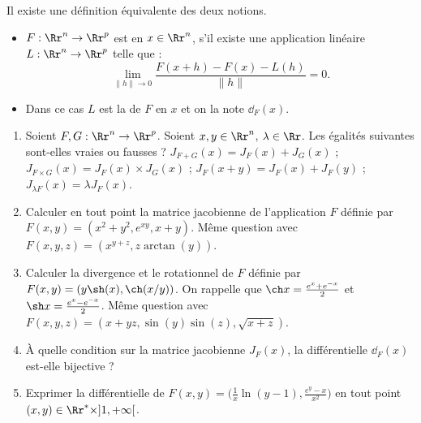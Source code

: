 \documentclass[12pt, class=report,crop=false]{standalone}
\begin{document}
\begin{remarque*}  
Il existe une définition équivalente des deux notions.

\begin{itemize}

  \item $F : \Rr^n \to \Rr^p$ est  en $x \in \Rr^n$, s'il existe une {application linéaire} $L : \Rr^n \to \Rr^p$ telle que :
$$
\lim_{\|h\| \to 0}  \frac{F(x + h) - F(x) - L (h)}{\|h\|} = 0 .$$

 \item Dans ce cas $L$ est la  de $F$ en $x$ et on la note $\dd_F(x)$.
\end{itemize}
\end{remarque*}


 
\begin{miniexercices}
\sauteligne
\begin{enumerate}
  \item Soient $F,G : \Rr^n \to \Rr^p$. Soient $x,y \in \Rr^n$, $\lambda \in \Rr$. Les égalités suivantes sont-elles vraies ou fausses ? 
  $J_{F+G} (x) = J_F(x) + J_G (x)$ ;
  $J_{F \times G} (x) = J_F(x) \times J_G (x)$ ;
  $J_{F} (x+y) = J_F(x) + J_F (y)$ ;  
  $J_{\lambda F} (x)= \lambda J_F (x)$.
  

  \item Calculer en tout point la matrice jacobienne de l'application $F$ définie par $F(x,y) = (x^2+y^2,e^{xy},x+y)$.
 Même question avec $F(x,y,z) = ( x^{y+z}, z\arctan(y) )$.
 
   \item Calculer la divergence et le rotationnel de $F$ définie par $F(x,y) = ( y\sh(x) , \ch(x/y))$.   
   On rappelle que $\ch x = \frac{e^x+e^{-x}}{2}$ et $\sh x = \frac{e^x-e^{-x}}{2}$. Même question avec 
   $F(x,y,z) = ( x+yz, \sin(y)\sin(z), \sqrt{x+z} )$.
    
   \item À quelle condition sur la matrice jacobienne $J_F(x)$, la différentielle $\dd_F (x)$ est-elle bijective ?
  
   \item Exprimer la différentielle de 
  $F(x,y) = \big( \frac{1}{x}\ln(y-1) , \frac{e^y-x}{x^2} \big)$ 
  en tout point $(x,y) \in \Rr^* \times ]1,+\infty[$.
\end{enumerate}
\end{miniexercices}
\end{document}
